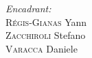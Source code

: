 \begin{titlepage}
\begin{minipage}{0.4\textwidth}
\begin{flushright} \large
\emph{Encadrant:} \\
\textsc{Régis-Gianas} Yann\\
\textsc{Zacchiroli} Stefano\\
\textsc{Varacca} Daniele
\end{flushright}
\end{minipage}
 
\endcenter

\end{titlepage}
